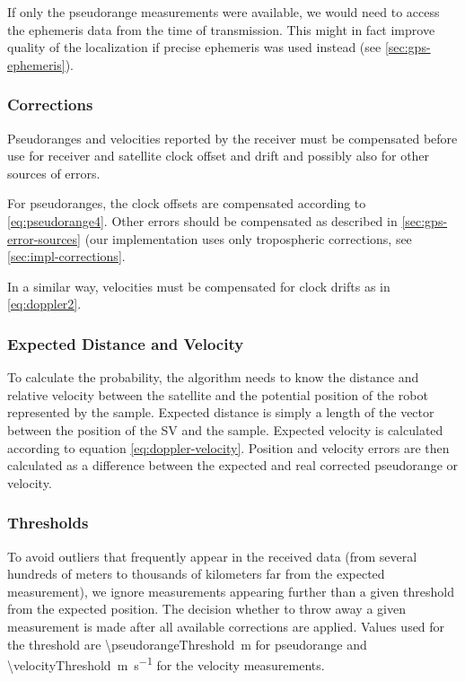 If only the pseudorange measurements were available, we would need to access the
ephemeris data from the time of transmission.
This might in fact improve quality of the localization if precise ephemeris
was used instead (see \cref{sec:gps-ephemeris}).

\subsubsection{Corrections}
Pseudoranges and velocities reported by the receiver must be compensated before
use for receiver and satellite clock offset and drift and possibly also for other
sources of errors.

For pseudoranges, the clock offsets are compensated according to \cref{eq:pseudorange4}.
Other errors should be compensated as described in \cref{sec:gps-error-sources}
(our implementation uses only tropospheric corrections, see \cref{sec:impl-corrections}.

In a similar way, velocities must be compensated for clock drifts 
as in \eqref{eq:doppler2}.

\subsubsection{Expected Distance and Velocity}
To calculate the probability, the algorithm needs to know the distance and relative
velocity between the satellite and the potential position of the robot represented
by the sample.
Expected distance is simply a length of the vector between the position of the SV
and the sample.
Expected velocity is calculated according to equation \eqref{eq:doppler-velocity}.
Position and velocity errors are then calculated as a difference between the expected
and real corrected pseudorange or velocity.

\subsubsection{Thresholds}
\label{sec:gps-thresholds}
To avoid outliers that frequently appear in the received data (from several hundreds
of meters to thousands of kilometers far from the expected measurement), we
ignore measurements appearing further than a given threshold from the expected position.
The decision whether to throw away a given measurement is made after all available corrections
are applied.
Values used for the threshold are \SI{\pseudorangeThreshold}{\meter} for pseudorange
and \SI{\velocityThreshold}{\meter\per\second} for the velocity measurements.

